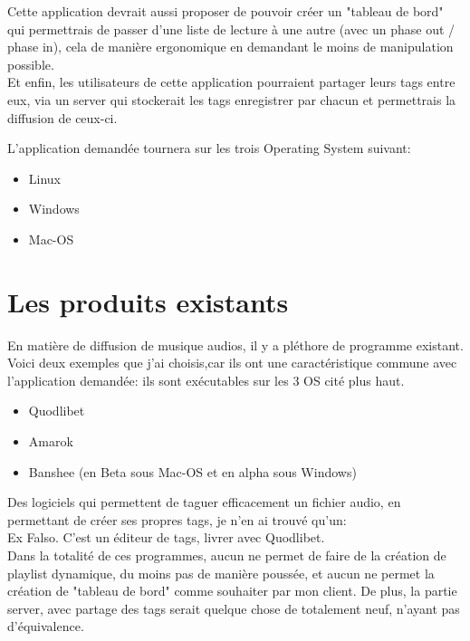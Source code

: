 \documentclass[a4paper,12pt]{report}
\begin{document}
Cette application devrait aussi proposer de pouvoir créer un "tableau de bord" qui permettrais de passer d'une liste de lecture à une autre (avec un phase out / phase in), cela de manière ergonomique en demandant le moins de manipulation possible.\\

Et enfin, les utilisateurs de cette application pourraient partager leurs tags entre eux, via un server qui stockerait les tags enregistrer par chacun et permettrais la diffusion de ceux-ci.

L'application demandée tournera sur les trois Operating System suivant:\\

\begin{itemize}
\item Linux
\item Windows
\item Mac-OS
\end{itemize}

\section{Les produits existants}

En matière de diffusion de musique audios, il y a pléthore de programme existant.
Voici deux exemples que j'ai choisis,car ils ont une caractéristique commune avec l'application demandée: ils sont exécutables sur les 3 OS cité plus haut. \\

\begin{itemize}
\item Quodlibet
\item Amarok
\item Banshee (en Beta sous Mac-OS et en alpha sous Windows)
\end{itemize}

Des logiciels qui permettent de taguer efficacement un fichier audio, en permettant de créer ses propres tags, je n'en ai trouvé qu'un:\\

Ex Falso.
C'est un éditeur de tags, livrer avec Quodlibet.\\

Dans la totalité de ces programmes, aucun ne permet de faire de la création de playlist dynamique, du moins pas de manière poussée, et aucun ne permet la création de "tableau de bord" comme souhaiter par mon client.
De plus, la partie server, avec partage des tags serait quelque chose de totalement neuf, n'ayant pas d'équivalence.
\end{document}
